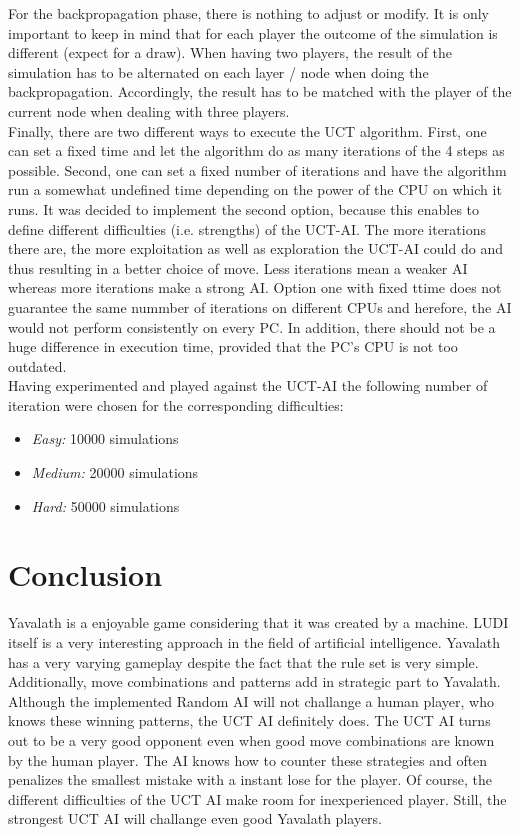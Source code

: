 \documentclass[english]{report}
\begin{document}
For the backpropagation phase, there is nothing to adjust or modify. It is only
important to keep in mind that for each player the outcome of the simulation is
different (expect for a draw). When having two players, the result of the
simulation has to be alternated on each layer / node when doing the
backpropagation. Accordingly, the result has to be matched with the player of
the current node when dealing with three players.\\

Finally, there are two different ways to execute the UCT algorithm. First, one
can set a fixed time and let the algorithm do as many iterations of the 4 steps
as possible. Second, one can set a fixed number of iterations and have the
algorithm run a somewhat undefined time depending on the power of the CPU on
which it runs. It was decided to implement the second option, because this
enables to define different difficulties (i.e. strengths) of the UCT-AI.
The more iterations there are, the more exploitation as well as exploration the
UCT-AI could do and thus resulting in a better choice of move. Less iterations
mean a weaker AI whereas more iterations make a strong AI. Option one with fixed
ttime does not guarantee the same nummber of iterations on different CPUs and
herefore, the AI would not perform consistently on every PC. In addition, there
should not be a huge difference in execution time, provided that the PC's CPU is
not too outdated. \\

Having experimented and played against the UCT-AI the following number of
iteration were chosen for the corresponding difficulties:
\begin{itemize}
	\item \textit{Easy:} 10000 simulations
	\item \textit{Medium:}  20000 simulations
	\item \textit{Hard:}  50000 simulations
\end{itemize}


\chapter{Conclusion}
Yavalath is a enjoyable game considering that it was created by a machine. LUDI
itself is a very interesting approach in the field of artificial intelligence.
Yavalath has a very varying gameplay despite the fact that the rule set is very
simple. Additionally, move combinations and patterns add in strategic part to
Yavalath. Although the implemented Random AI will not challange a human player,
who knows these winning patterns, the UCT AI definitely does. The UCT AI turns
out to be a very good opponent even when good move combinations are known by the
human player. The AI knows how to counter these strategies and often penalizes
the smallest mistake with a instant lose for the player. Of course, the
different difficulties of the UCT AI make room for inexperienced player. Still,
the strongest UCT AI will challange even good Yavalath players.

\end{document}
